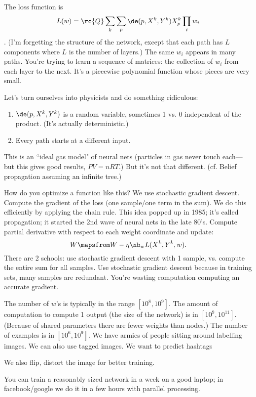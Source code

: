 The loss function is \[L(w)=\rc{Q}\sum_k \sum_p\de(p, X^k,Y^k) X_p^k \prod_i w_i\].
(I'm forgetting the structure of the network, except that each path has $L$ components where $L$ is the number of layers.) The same $w_i$ appears in many paths. You're trying to learn a sequence of matrices: the collection of $w_i$ from each layer to the next.
It's a piecewise polynomial function whose pieces are very small.

Let's turn ourselves into physicists and do something ridiculous:
\begin{enumerate}
\item
$\de(p,X^k,Y^k)$ is a random variable, sometimes 1 vs. 0 independent of the product. (It's actually deterministic.)
\item
Every path starts at a different input.
\end{enumerate}
This is an ``ideal gas model" of neural nets (particles in gas never touch each---but this gives good results, $PV=n RT$.)
But it's not that different. 
(cf. Belief propagation assuming an infinite tree.) 

How do you optimize a function like this? We use stochastic gradient descent. Compute the gradient of the loss (one sample/one term in the sum). We do this efficiently by applying the chain rule. This idea popped up in 1985; it's called propagation; it started the 2nd wave of neural nets in the late 80's. Compute partial derivative with respect to each weight coordinate and update:
\[
W\mapsfrom W-\eta \nb_w L(X^k,Y^k,w).
\]
There are 2 schools: use stochastic gradient descent with 1 sample, vs. compute the entire sum for all samples. Use stochastic gradient descent because in training sets, many samples are redundant. You're wasting computation computing an accurate gradient. 

The number of $w$'s is typically in the range $[10^8,10^9]$. The amount of computation to compute 1 output (the size of the network) is in $[10^9,10^{11}]$. (Because of shared parameters there are fewer weights than nodes.) The number of examples is in $[10^6,10^9]$. We have armies of people sitting around labelling images. We can also use tagged images. We want to predict hashtags 

We also flip, distort the image for better training.

You can train a reasonably sized network in a week on a good laptop; in facebook/google we do it in a few hours with parallel processing.

